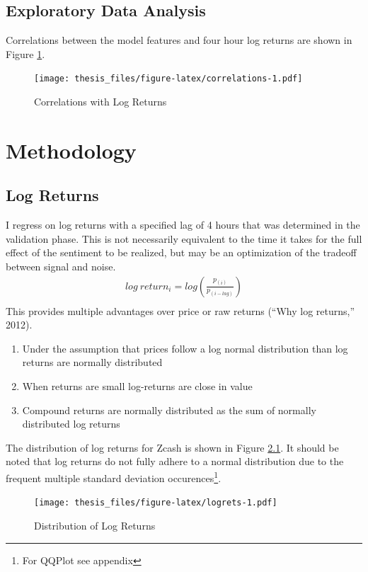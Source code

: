 \documentclass[12pt,twoside]{dukestatscithesis}
\providecommand{\tightlist}{%
  \setlength{\itemsep}{0pt}\setlength{\parskip}{0pt}}
\begin{document}
\section{Exploratory Data Analysis}\label{exploratory-data-analysis}

Correlations between the model features and four hour log returns are
shown in Figure \ref{fig:correlations}.
\begin{figure}
\centering
\texttt{[image: thesis\_files/figure-latex/correlations-1.pdf]}
\caption{\label{fig:correlations}Correlations with Log Returns}
\end{figure}
\chapter{Methodology}\label{method}

\section{Log Returns}\label{log-returns}

I regress on log returns with a specified lag of 4 hours that was
determined in the validation phase. This is not necessarily equivalent
to the time it takes for the full effect of the sentiment to be
realized, but may be an optimization of the tradeoff between signal and
noise.
\begin{align}
  log \:  return_i = log(\frac{p_{(i)}}{p_{(i-lag)}}) \label{eq:5} \\ 
\end{align}
This provides multiple advantages over price or raw returns (``Why log
returns,'' 2012).
\begin{enumerate}
\def\labelenumi{\arabic{enumi}.}
\tightlist
\item
  Under the assumption that prices follow a log normal distribution than
  log returns are normally distributed
\item
  When returns are small log-returns are close in value
\item
  Compound returns are normally distributed as the sum of normally
  distributed log returns
\end{enumerate}
The distribution of log returns for Zcash is shown in Figure
\ref{fig:logrets}. It should be noted that log returns do not fully
adhere to a normal distribution due to the frequent multiple standard
deviation occurences\footnote{For QQPlot see appendix}.
\begin{figure}
\centering
\texttt{[image: thesis\_files/figure-latex/logrets-1.pdf]}
\caption{\label{fig:logrets}Distribution of Log Returns}
\end{figure}
\end{document}
